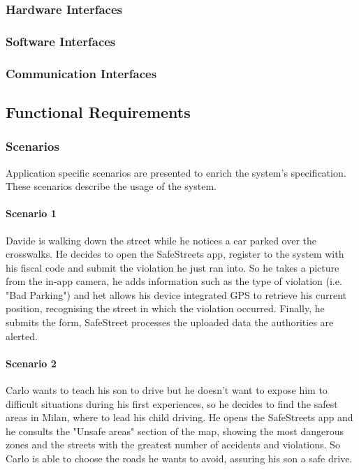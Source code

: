 \subsubsection{Hardware Interfaces}
	
\subsubsection{Software Interfaces}
\subsubsection{Communication Interfaces}

\clearpage

\subsection{Functional Requirements}

\subsubsection{Scenarios}

Application specific scenarios are presented to enrich the system's specification. These scenarios describe the usage of the system.

\paragraph{Scenario 1}
\label{scenario:1}
	Davide is walking down the street while he notices a car parked over the crosswalks. He decides to open the SafeStreets app, register to the system with his fiscal code and submit the violation he just ran into. So he takes a picture from the in-app camera, he adds information such as the type of violation (i.e. "Bad Parking") and het allows his device integrated GPS to retrieve his current position, recognising the street in which the violation occurred. Finally, he submits the form, SafeStreet processes the uploaded data the authorities are alerted.

\paragraph{Scenario 2}
\label{scenario:2}
	Carlo wants to teach his son to drive but he doesn't want to expose him to difficult situations during his first experiences, so he decides to find the safest areas in Milan, where to lead his child driving. He opens the SafeStreets app and he consults the "Unsafe areas" section of the map, showing the most dangerous zones and the streets with the greatest number of accidents and violations. So Carlo is able to choose the roads he wants to avoid, assuring his son a safe drive.

